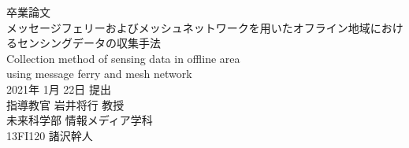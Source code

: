 \thispagestyle{empty}
\begin{center}
\vspace*{-1cm}
\Huge{卒業論文}\\
\vspace{1cm}
\LARGE{メッセージフェリーおよびメッシュネットワークを用いたオフライン地域におけるセンシングデータの収集手法}\\
\vspace{0.2cm}
\large{Collection method of sensing data in offline area\\using message ferry and mesh network}\\
\vspace{2cm}
\Large{2021年 1月 22日 提出}\\
\vspace{2cm}
\LARGE{指導教官 岩井将行 教授}\\
\vspace{1cm}
\LARGE{未来科学部 情報メディア学科}\\
\vspace{1cm}
\huge{13FI120 諸沢幹人}\\
\end{center}
